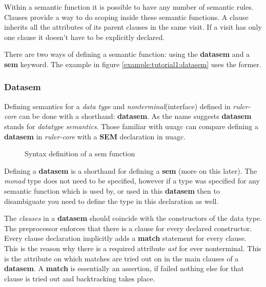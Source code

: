 \documentclass[twoside, titlepage, openright, a4paper]{book}
\newcommand{\Varid}[1]{\mathit{#1}}
\def\resethooks{%
  \global\let\SaveRestoreHook\empty
  \global\let\ColumnHook\empty}
\newcommand{\hsindent}[1]{\quad}%
\let\hspre\empty
\let\hspost\empty
\newcommand{\rcore}{\emph{ruler-core }}
\begin{document}
Within a semantic function it is possible to have any number of semantic rules. Clauses provide a way to do scoping inside these semantic functions. A clause inherits all the attributes of its parent clauses in the same visit. If a visit has only one clause it doesn't have to be explicitly declared. 

There are two ways of defining a semantic function: using the \textbf{datasem} and a \textbf{sem} keyword. The example in figure \ref{example:tutorial1:datasem} uses the former.

\subsubsection{Datasem}
Defining semantics for a \emph{data type} and \emph{nonterminal}(interface) defined in \rcore can be done with a shorthand: \textbf{datasem}. As the name suggests \textbf{datasem} stands for \emph{datatype semantics}. Those familiar with uuagc can compare defining a \textbf{datasem} in \rcore with a \textbf{SEM} declaration in uuagc.

\begin{figure}[!h]
\resethooks
\caption{Syntax definition of a sem function}
\label{datasem:syntax}
\end{figure}

Defining a \textbf{datasem} is a shorthand for defining a \textbf{sem} (more on this later). The \emph{monad} type does not need to be specified, however if a type was specified for any semantic function which is used by, or used in this \textbf{datasem} then to disambiguate you need to define the type in this declaration as well.

The \emph{clauses} in a \textbf{datasem} should coincide with the constructors of the data type. The preprocessor enforces that there is a clause for every declared constructor. Every clause declaration implicitly adds a \textbf{match} statement for every clause. This is the reason why there is a required attribute \emph{ast} for ever nonterminal. This is the attribute on which matches are tried out on in the main clauses of a \textbf{datasem}. A \textbf{match} is essentially an assertion, if failed nothing else for that clause is tried out and backtracking takes place.
\end{document}
